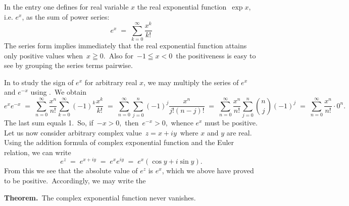 \documentclass[12pt]{article}
\theoremstyle{definition}
\begin{document}
In the entry  one defines for real variable $x$ the real exponential function \,$\exp{x}$, i.e. $e^x$, as the sum of power series:
$$e^x \;=\; \sum_{k=0}^\infty\frac{x^k}{k!}$$
The series form implies immediately that the real exponential 
function attains only positive values when\, $x \geqq 0$.\, Also 
for\, $-1 \leqq x < 0$\, the positiveness is easy to see by 
grouping the series terms pairwise.

In  to study the sign of $e^x$ for 
arbitrary real $x$, we may multiply the series of $e^x$ and 
$e^{-x}$ using .\, We obtain
$$e^xe^{-x} \;=\; \sum_{n=0}^\infty\frac{x^n}{n!}\!\sum_{k=0}^\infty(-1)^k\frac{x^k}{k!} 
\;=\; \sum_{n=0}^\infty\!\sum_{j=0}^n(-1)^j\frac{x^n}{j!(n\!-\!j)!} 
\;=\; \sum_{n=0}^\infty\frac{x^n}{n!}\!\sum_{j=0}^n\!{n\choose j}(-1)^j \;=\; \sum_{n=0}^\infty\frac{x^n}{n!}\cdot0^n.$$
The last sum equals 1.\, So, if\, $-x > 0$,\, then\, $e^{-x} > 0$,\, whence $e^x$ must be positive.\\

Let us now consider arbitrary complex value\, $z = x\!+\!iy$\, where $x$ and $y$ are real.\, Using the addition formula of complex exponential function and the Euler relation, we can write
$$e^z \;=\; e^{x+iy} \;=\; e^xe^{iy} \;=\; e^x(\cos{y}+i\sin{y}).$$
From this we see that the absolute value of $e^z$ is $e^x$, which we above have proved to be positive.\, Accordingly, we may write the

\textbf{Theorem.}\, The complex exponential function never vanishes.



\end{document}
